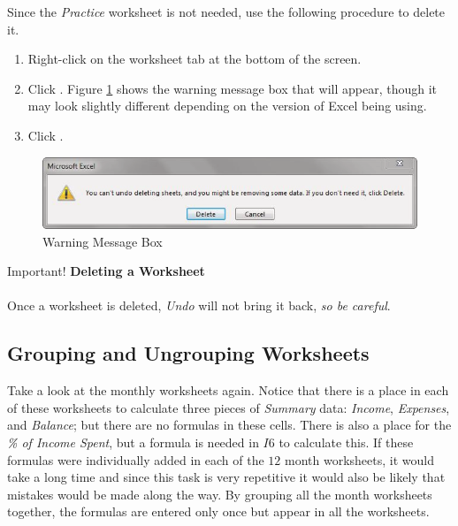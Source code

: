 Since the \textit{Practice} worksheet is not needed, use the following procedure to delete it.

\begin{enumerate}
	\item Right-click on the  worksheet tab at the bottom of the screen.
	\item Click . Figure \ref{06:fig03} shows the warning message box that will appear, though it may look slightly different depending on the version of Excel being using. 
	\item Click .
\end{enumerate}

\begin{figure}[H]
	\centering
	\includegraphics[width=\maxwidth{.95\linewidth}]{gfx/ch06_fig03}
	\caption{Warning Message Box}
	\label{06:fig03}
\end{figure}

\begin{center}
	\begin{infobox}{Important!}
		\textbf{Deleting a Worksheet}
		\\
		\\
		Once a worksheet is deleted, \textit{Undo} will not bring it back, \textit{so be careful}.
	\end{infobox}
\end{center}

\subsection{Grouping and Ungrouping Worksheets}

Take a look at the monthly worksheets again. Notice that there is a place in each of these worksheets to calculate three pieces of \textit{Summary} data: \textit{Income}, \textit{Expenses}, and \textit{Balance}; but there are no formulas in these cells. There is also a place for the \textit{\% of Income Spent}, but a formula is needed in $ I6 $ to calculate this. If these formulas were individually added in each of the $ 12 $ month worksheets, it would take a long time and since this task is very repetitive it would also be likely that mistakes would be made along the way. By grouping all the month worksheets together, the formulas are entered only once but appear in all the worksheets.

